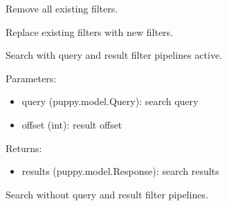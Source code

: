 \documentclass[letterpaper,10pt,english]{sphinxmanual}
\begin{document}
\begin{fulllineitems}
\begin{fulllineitems}
\end{fulllineitems}


\begin{fulllineitems}
\label{api2.0:puppy.service.SearchService.clear_filters}
Remove all existing filters.

\end{fulllineitems}


\begin{fulllineitems}
\label{api2.0:puppy.service.SearchService.replace_filters}
Replace existing filters with new filters.

\end{fulllineitems}


\begin{fulllineitems}
\label{api2.0:puppy.service.SearchService.search}
Search with query and result filter pipelines active.

Parameters:
\begin{itemize}
\item {} 
query (puppy.model.Query): search query

\item {} 
offset (int): result offset

\end{itemize}

Returns:
\begin{itemize}
\item {} 
results (puppy.model.Response): search results

\end{itemize}

\end{fulllineitems}


\begin{fulllineitems}
\label{api2.0:puppy.service.SearchService.simplesearch}
Search without query and result filter pipelines.


\end{fulllineitems}
\end{fulllineitems}
\end{document}
